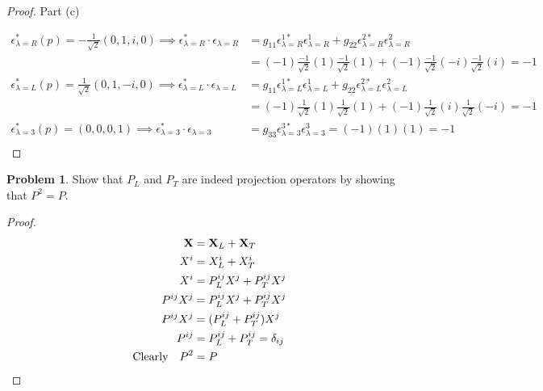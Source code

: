 \documentclass[letterpaper]{article}
\theoremstyle{definition}
\newtheorem{prob}{Problem}[section]
\begin{document}
\begin{proof}Part (c)



  \begin{align*}
    \epsilon_{\lambda=R}^*(p)=-\frac{1}{\sqrt{2}}(0,1,i,0)\implies \epsilon_{\lambda=R}^*\cdot\epsilon_{\lambda=R} & =g_{11}\epsilon_{\lambda=R}^{1*}\epsilon_{\lambda=R}^1+g_{22}\epsilon_{\lambda=R}^{2*}\epsilon_{\lambda=R}^2 \\
                                                                                                                   & =(-1)\frac{-1}{\sqrt{2}}(1)\frac{-1}{\sqrt{2}}(1)+(-1)\frac{-1}{\sqrt{2}}(-i)\frac{-1}{\sqrt{2}}(i)=-1
    \\
    \epsilon_{\lambda=L}^*(p)=\frac{1}{\sqrt{2}}(0,1,-i,0)\implies \epsilon_{\lambda=L}^*\cdot\epsilon_{\lambda=L} & =g_{11}\epsilon_{\lambda=L}^{1*}\epsilon_{\lambda=L}^1+g_{22}\epsilon_{\lambda=L}^{2*}\epsilon_{\lambda=L}^2 \\
                                                                                                                   & =(-1)\frac{1}{\sqrt{2}}(1)\frac{1}{\sqrt{2}}(1)+(-1)\frac{1}{\sqrt{2}}(i)\frac{1}{\sqrt{2}}(-i)
    =-1                                                                                                                                                                                                                           \\
    \epsilon_{\lambda=3}^*(p)=(0,0,0,1)\implies \epsilon_{\lambda=3}^*\cdot\epsilon_{\lambda=3}                    & =g_{33}\epsilon_{\lambda=3}^{3*}\epsilon_{\lambda=3}^3=(-1)(1)(1)
    =-1                                                                                                                                                                                                                           \\
  \end{align*}
\end{proof}

\begin{prob}
  Show that $P_L$ and $P_T$ are indeed projection operators by showing that $P^2=P$.
\end{prob}
\begin{proof}
  \begin{align*}
    \vb{X}           & =\vb{X}_L+\vb{X}_T             \\
    X^i              & =X^i_L+X^i_T                   \\
    X^i              & =P^{ij}_LX^j+P^{ij}_TX^j       \\
    P^{ij}X^j        & =P^{ij}_LX^j+P^{ij}_TX^j       \\
    P^{ij}X^j        & =(P^{ij}_L+P^{ij}_T)X^j        \\
    P^{ij}           & =P^{ij}_L+P^{ij}_T=\delta_{ij} \\
    \qq*{Clearly}P^2 & =P
  \end{align*}
\end{proof}
\end{document}
